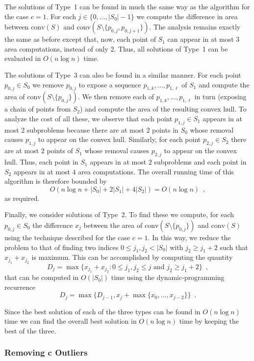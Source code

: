 \documentclass[lotsofwhite]{patmorin}
\newcommand{\ch}{\mathrm{conv}}
\begin{document}
The solutions of Type~1 can be found in much the same way as the
algorithm for the case $c=1$.  For each $j\in\{0,\ldots,|S_0|-1\}$ we
compute the difference in area between $\ch(S)$ and
$\ch(S\setminus\{p_{0,j},p_{0,j+1}\})$.  The analysis remains exactly
the same as before except that, now, each point of $S_1$ can appear in
at most $3$ area computations, instead of only 2.  Thus, all solutions
of Type~1 can be evaluated in $O(n\log n)$ time.

The solutions of Type~3 can also be found in a similar manner.  For
each point $p_{0,j}\in S_0$ we remove $p_{0,j}$ to expose a sequence
$p_{1,k},\ldots,p_{1,\ell}$ of $S_1$ and compute the area of
$\ch(S\setminus\{p_{0,j}\})$.  We then remove each of
$p_{1,k},\ldots,p_{1,\ell}$ in turn (exposing a chain of points from
$S_2$) and compute the area of the resulting convex hull.  To analyze
the cost of all these, we observe that each point $p_{1,j}\in S_1$
appears in at most 2 subproblems because there are at most 2 points in
$S_0$ whose removal causes $p_{1,j}$ to appear on the convex hull.
Similarly, for each point $p_{2,j}\in S_2$ there are at most 2 points
of $S_1$ whose removal causes $p_{2,j}$ to appear on the convex hull.
Thus, each point in $S_1$ appears in at most 2 subproblems and each
point in $S_2$ appears in at most $4$ area computations.  The overall
running time of this algorithm is therefore bounded by
\[
    O\left(n\log n + |S_0| + 2|S_1| + 4|S_2|\right) = O(n\log n) \enspace ,
\]
as required.

Finally, we consider solutions of Type~2.  To find these we compute,
for each $p_{0,j}\in S_0$ the difference $x_j$ between the area of
$\ch(S\setminus\{p_{0,j}\})$ and $\ch(S)$ using the technique
described for the case $c=1$.  In this way, we reduce the problem to
that of finding two indices $0\le j_1,j_2< |S_0|$ with $j_2\ge j_1+2$
such that $x_{j_1}+x_{j_2}$ is maximum.  This can be accomplished by
computing the quantity
\[
     D_j = \max\{x_{j_1}+x_{j_2} :
       \mbox{$0\le j_1,j_2\le j$ and $j_2 \ge j_1+2$}\} \enspace ,
\]
that can be computed in $O(|S_0|)$ time using the dynamic-programming 
recurrence
\[
    D_j = \max\{D_{j-1}, x_{j} + \max\{x_{0},\ldots,x_{j-2}\}\}
                \enspace .
\]

Since the best solution of each of the three types can be found in
$O(n\log n)$ time we can find the overall best solution in $O(n\log
n)$ time by keeping the best of the three.

\subsubsection{Removing $\mathbf{c}$ Outliers}
\end{document}
